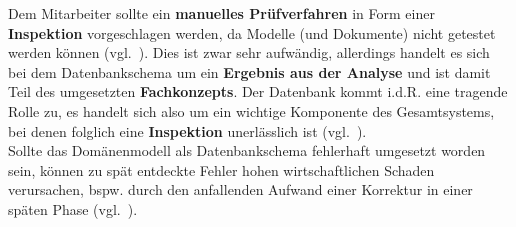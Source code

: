 

Dem Mitarbeiter sollte ein \textbf{manuelles Prüfverfahren} in Form einer \textbf{Inspektion} vorgeschlagen werden, da Modelle (und Dokumente) nicht getestet werden können (vgl.~\cite[10]{Wed09c}). Dies ist zwar sehr aufwändig, allerdings handelt es sich bei dem Datenbankschema um ein \textbf{Ergebnis aus der Analyse} und ist damit  Teil des umgesetzten \textbf{Fachkonzepts}. Der Datenbank kommt i.d.R. eine tragende Rolle zu, es handelt sich also um ein wichtige Komponente des Gesamtsystems, bei denen folglich eine \textbf{Inspektion} unerlässlich ist (vgl.~\cite[16]{Wed09c}).\\
Sollte das Domänenmodell als Datenbankschema fehlerhaft umgesetzt worden sein, können zu spät entdeckte Fehler hohen wirtschaftlichen Schaden verursachen, bspw. durch den anfallenden Aufwand einer Korrektur in einer späten Phase (vgl.~\cite[484 ff.]{Bal08}).